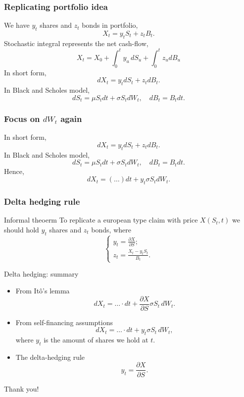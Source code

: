 \begin{frame}
    \frametitle{Replicating portfolio idea}

    We have $y_t$ shares and $z_t$ bonds in portfolio, 
    \[
    X_t = y_t S_t + z_t B_t.    
    \]
    \pause 
    Stochastic integral represents the net cash-flow,
    \[
    X_t = X_0 + \int_0^t y_u \, dS_u + \int_0^t z_u dB_u
    \]
    In short form, 
    \[
    dX_t = y_t dS_t + z_t dB_t.    
    \]
    \pause 
    In Black and Scholes model,
    \[
        dS_t = \mu S_t dt + \sigma S_t dW_t, \quad dB_t = B_t dt.
    \]

\end{frame}


\begin{frame}
    \frametitle{Focus on $dW_t$ again }
    In short form, 
    \[
    dX_t = y_t dS_t + z_t dB_t.    
    \]
    In Black and Scholes model,
    \[
        dS_t = \mu S_t dt + \sigma S_t dW_t, \quad dB_t = B_t dt.
    \]
    \pause
    Hence,
    \[
    dX_t =   (\ldots) dt +  y_t \sigma S_t dW_t.   
    \]
\end{frame}

\begin{frame}
    \frametitle{Delta hedging rule}
    \begin{block}{Informal theoerm \informalduck}
        To replicate a european type claim with price $X(S_t, t)$ we should hold $y_t$ shares and $z_t$ bonds, 
        where 
        \[
            \begin{cases}
                y_t = \frac{\partial X}{\partial S}; \\
                z_t = \frac{X_t - y_t S_t}{B_t}.    
            \end{cases}
        \]
    \end{block}
\end{frame}



    \begin{frame}{Delta hedging: summary}
      
      \begin{itemize}[<+->]
          \item From \alert{Itô's lemma}
          \[
          dX_t = \ldots \cdot  dt + \frac{\partial X}{\partial S} \sigma S_t \, dW_t.    
          \]

          \item From \alert{self-financing} assumptions
          \[
          dX_t = \ldots \cdot  dt + y_t \sigma S_t \, dW_t,    
          \]
          where $y_t$  is the amount of shares we hold at $t$.

          \item The \alert{delta-hedging} rule
          \[
          y_t =  \frac{\partial X}{\partial S}.
          \]

      \end{itemize}
      \pause
      Thank you! \knightduck \formalduck \informalduck \harlequinduck

    \end{frame}
      